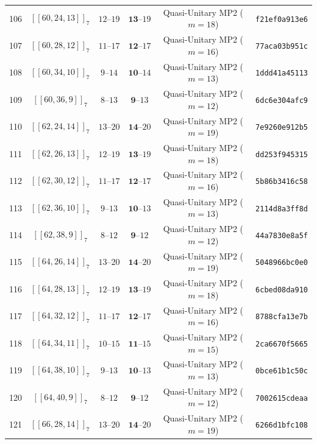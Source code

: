 \documentclass[11pt,a4paper]{article}
\theoremstyle{remark}
\begin{document}
{\begin{longtable}{@{}rccccl@{}}
106 & $[[60,24,13]]_{7}$ & $12\text{--}19$ & $\mathbf{13}\text{--}19$ & Quasi-Unitary MP2 ($m=18$) & \texttt{f21ef0a913e6} \\
107 & $[[60,28,12]]_{7}$ & $11\text{--}17$ & $\mathbf{12}\text{--}17$ & Quasi-Unitary MP2 ($m=16$) & \texttt{77aca03b951c} \\
108 & $[[60,34,10]]_{7}$ & $9\text{--}14$ & $\mathbf{10}\text{--}14$ & Quasi-Unitary MP2 ($m=13$) & \texttt{1ddd41a45113} \\
109 & $[[60,36,9]]_{7}$ & $8\text{--}13$ & $\mathbf{9}\text{--}13$ & Quasi-Unitary MP2 ($m=12$) & \texttt{6dc6e304afc9} \\
110 & $[[62,24,14]]_{7}$ & $13\text{--}20$ & $\mathbf{14}\text{--}20$ & Quasi-Unitary MP2 ($m=19$) & \texttt{7e9260e912b5} \\
111 & $[[62,26,13]]_{7}$ & $12\text{--}19$ & $\mathbf{13}\text{--}19$ & Quasi-Unitary MP2 ($m=18$) & \texttt{dd253f945315} \\
112 & $[[62,30,12]]_{7}$ & $11\text{--}17$ & $\mathbf{12}\text{--}17$ & Quasi-Unitary MP2 ($m=16$) & \texttt{5b86b3416c58} \\
113 & $[[62,36,10]]_{7}$ & $9\text{--}13$ & $\mathbf{10}\text{--}13$ & Quasi-Unitary MP2 ($m=13$) & \texttt{2114d8a3ff8d} \\
114 & $[[62,38,9]]_{7}$ & $8\text{--}12$ & $\mathbf{9}\text{--}12$ & Quasi-Unitary MP2 ($m=12$) & \texttt{44a7830e8a5f} \\
115 & $[[64,26,14]]_{7}$ & $13\text{--}20$ & $\mathbf{14}\text{--}20$ & Quasi-Unitary MP2 ($m=19$) & \texttt{5048966bc0e0} \\
116 & $[[64,28,13]]_{7}$ & $12\text{--}19$ & $\mathbf{13}\text{--}19$ & Quasi-Unitary MP2 ($m=18$) & \texttt{6cbed08da910} \\
117 & $[[64,32,12]]_{7}$ & $11\text{--}17$ & $\mathbf{12}\text{--}17$ & Quasi-Unitary MP2 ($m=16$) & \texttt{8788cfa13e7b} \\
118 & $[[64,34,11]]_{7}$ & $10\text{--}15$ & $\mathbf{11}\text{--}15$ & Quasi-Unitary MP2 ($m=15$) & \texttt{2ca6670f5665} \\
119 & $[[64,38,10]]_{7}$ & $9\text{--}13$ & $\mathbf{10}\text{--}13$ & Quasi-Unitary MP2 ($m=13$) & \texttt{0bce61b1c50c} \\
120 & $[[64,40,9]]_{7}$ & $8\text{--}12$ & $\mathbf{9}\text{--}12$ & Quasi-Unitary MP2 ($m=12$) & \texttt{7002615cdeaa} \\
121 & $[[66,28,14]]_{7}$ & $13\text{--}20$ & $\mathbf{14}\text{--}20$ & Quasi-Unitary MP2 ($m=19$) & \texttt{6266d1bfc108} \\

\end{longtable}}
\end{document}
